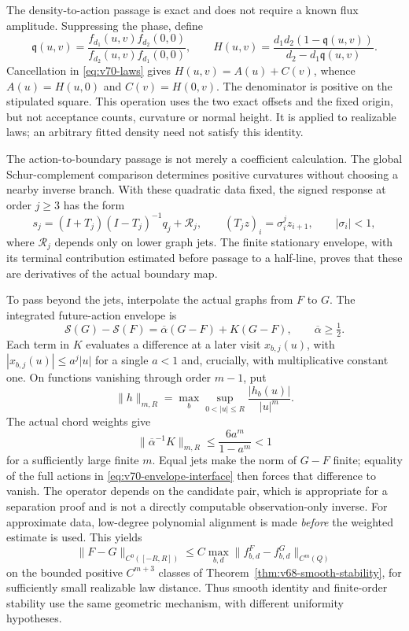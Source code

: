 The density-to-action passage is exact and does not require a known
flux amplitude.  Suppressing the phase, define
\[
 \mathfrak q(u,v)=
 \frac{f_{d_1}(u,v)f_{d_2}(0,0)}
      {f_{d_2}(u,v)f_{d_1}(0,0)},\qquad
 H(u,v)=\frac{d_1d_2(1-\mathfrak q(u,v))}
                   {d_2-d_1\mathfrak q(u,v)}.
\]
Cancellation in \eqref{eq:v70-laws} gives
$H(u,v)=A(u)+C(v)$, whence $A(u)=H(u,0)$ and $C(v)=H(0,v)$.
The denominator is positive on the stipulated square.  This operation
uses the two exact offsets and the fixed origin, but not acceptance
counts, curvature or normal height.  It is applied to realizable laws;
an arbitrary fitted density need not satisfy this identity.

The action-to-boundary passage is not merely a coefficient calculation.
The global Schur-complement comparison determines positive curvatures
without choosing a nearby inverse branch.  With these quadratic data
fixed, the signed response at order $j\ge3$ has the form
\[
 s_j=(I+T_j)(I-T_j)^{-1}q_j+\mathcal R_j,
 \qquad (T_jz)_i=\sigma_i^jz_{i+1},\qquad |\sigma_i|<1,
\]
where $\mathcal R_j$ depends only on lower graph jets.
The finite stationary envelope, with its terminal contribution estimated
before passage to a half-line, proves that these are derivatives of the
actual boundary map.

To pass beyond the jets, interpolate the actual graphs from $F$ to $G$.
The integrated future-action envelope is
\begin{equation}\label{eq:v70-envelope-interface}
 \mathcal S(G)-\mathcal S(F)=\overline\alpha(G-F)+K(G-F),
 \qquad \overline\alpha\ge\tfrac12.
\end{equation}
Each term in $K$ evaluates a difference at a later visit
$x_{b,j}(u)$, with $|x_{b,j}(u)|\le a^j|u|$ for a single $a<1$
and, crucially, with multiplicative constant one.  On functions vanishing
through order $m-1$, put
\[
 \|h\|_{m,R}=\max_b\sup_{0<|u|\le R}\frac{|h_b(u)|}{|u|^m}.
\]
The actual chord weights give
\begin{equation}\label{eq:v70-tail}
 \|\overline\alpha^{-1}K\|_{m,R}
        \le\frac{6a^m}{1-a^m}<1
\end{equation}
for a sufficiently large finite $m$.  Equal jets make the norm of $G-F$
finite; equality of the full actions in
\eqref{eq:v70-envelope-interface} then forces that difference to vanish.
The operator depends on the candidate pair, which is appropriate for a
separation proof and is not a directly computable observation-only
inverse.  For approximate data, low-degree polynomial alignment is made
\emph{before} the weighted estimate is used.  This yields
\begin{equation}\label{eq:v70-real-stability}
 \|F-G\|_{C^0([-R,R])}\le
 C\max_{b,d}\|f^F_{b,d}-f^G_{b,d}\|_{C^m(Q)}
\end{equation}
on the bounded positive $C^{m+3}$ classes of
Theorem~\ref{thm:v68-smooth-stability}, for sufficiently small realizable
law distance.  Thus smooth identity and finite-order stability use the
same geometric mechanism, with different uniformity hypotheses.

